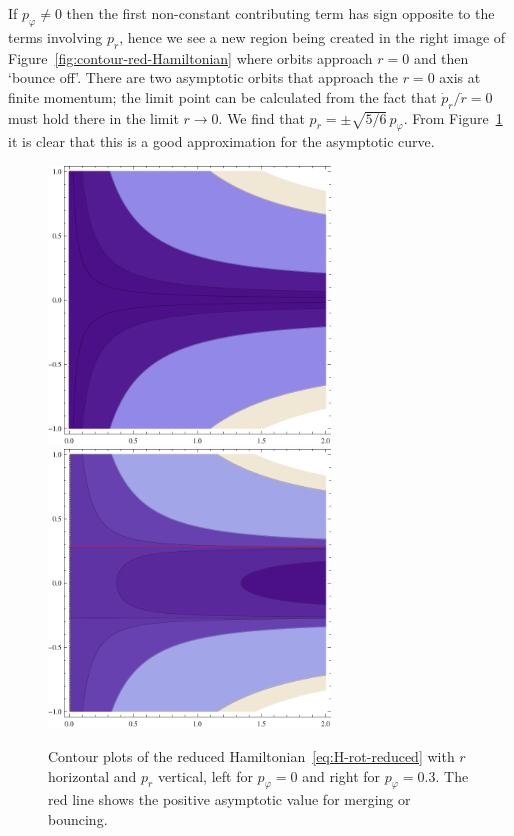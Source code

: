 \documentclass[12pt]{amsart}
\begin{document}
If $p_\varphi \neq 0$ then the first non-constant contributing term has
sign opposite to the terms involving $p_r$, hence we see a new region
being created in the right image of Figure~\eqref{fig:contour-red-Hamiltonian} where orbits
approach $r = 0$ and then `bounce off'. There are two asymptotic
orbits that approach the $r = 0$ axis at finite momentum; the limit
point can be calculated from the fact that $\dot{p}_r / \dot{r} = 0$
must hold there in the limit $r \to 0$. We find that
$p_r = \pm \sqrt{5/6}\,p_\varphi$. From
Figure~\ref{fig:contour-red-Hamiltonian} it is clear that this is a good
approximation for the asymptotic curve.

\begin{figure}[ht]
  \centering
  \includegraphics[width=7.5cm]{Ham-contour-Jzero}
  \hspace{0.5cm}
  \includegraphics[width=7.5cm]{Ham-contour-Jnonzero}
  \caption{Contour plots of the reduced
    Hamiltonian~\eqref{eq:H-rot-reduced} with $r$ horizontal and $p_r$
    vertical, left for $p_\varphi = 0$ and right for
    $p_\varphi = 0.3$. The red line shows the positive asymptotic
    value for merging or bouncing.}
  \label{fig:contour-red-Hamiltonian}
\end{figure}
\end{document}
